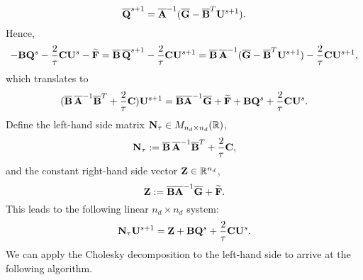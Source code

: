 \begin{discussion}
  \begin{equation}
    \overline{\bf Q}^{s + 1}
    = \overline{\bf A}^{-1}
      (\overline{\bf G} - \overline{\bf B}^T {\bf U}^{s + 1}).
  \end{equation}
  Hence,
  \begin{equation}
    - {\bf B} {\bf Q}^s - \frac{2}{\tau} {\bf C} {\bf U}^s - \widetilde{\bf F}
    = \overline{\bf B}\, \overline{\bf Q}^{s + 1}
      - \frac{2}{\tau} {\bf C} {\bf U}^{s + 1}
    = \overline{\bf B}\, \overline{\bf A}^{-1}
      (\overline{\bf G} - \overline{\bf B}^T {\bf U}^{s + 1})
      - \frac{2}{\tau} {\bf C} {\bf U}^{s + 1},
  \end{equation}
  which translates to
  \begin{equation}
    (\overline{\bf B}\, \overline{\bf A}^{-1} \overline{\bf B}^T
      + \frac{2}{\tau} {\bf C}) {\bf U}^{s + 1}
    = \overline{\bf B} \overline{\bf A}^{-1} \overline{\bf G}
      + \widetilde{\bf F} + {\bf B} {\bf Q}^s + \frac{2}{\tau} {\bf C} {\bf U}^s.
  \end{equation}
  Define the left-hand side matrix ${\bf N}_\tau \in M_{n_d \times n_d}(\mathbb{R})$,
  \begin{equation}
    {\bf N}_\tau
    := \overline{\bf B}\, \overline{\bf A}^{-1} \overline{\bf B}^T
      + \frac{2}{\tau} {\bf C},
  \end{equation}
  and the constant right-hand side vector ${\bf Z} \in \mathbb{R}^{n_d}$,
  \begin{equation}
    {\bf Z}
    := \overline{\bf B} \overline{\bf A}^{-1} \overline{\bf G}
      + \widetilde{\bf F}.
  \end{equation}
  This leads to the following linear $n_d \times n_d$ system:
  \begin{equation}
    {\bf N}_\tau {\bf U}^{s + 1}
    = {\bf Z} + {\bf B} {\bf Q}^s + \frac{2}{\tau} {\bf C} {\bf U}^s.
  \end{equation}
  We can apply the Cholesky decomposition to the left-hand side to arrive at
  the following algorithm.
\end{discussion}
